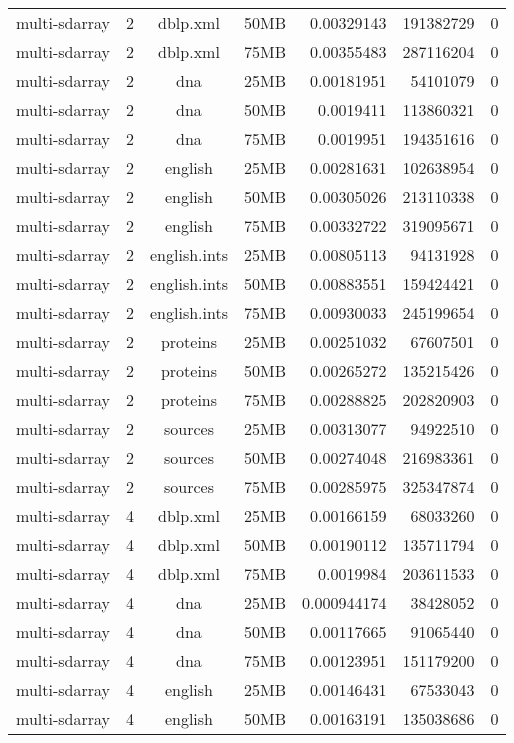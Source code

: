 \begin{table}[h]
\begin{center}
\begin{tabular}{ccccrrr}
multi-sdarray & 2 & dblp.xml & 50MB & 0.00329143 & 191382729 & 0 \\
multi-sdarray & 2 & dblp.xml & 75MB & 0.00355483 & 287116204 & 0 \\
multi-sdarray & 2 & dna & 25MB & 0.00181951 & 54101079 & 0 \\
multi-sdarray & 2 & dna & 50MB & 0.0019411 & 113860321 & 0 \\
multi-sdarray & 2 & dna & 75MB & 0.0019951 & 194351616 & 0 \\
multi-sdarray & 2 & english & 25MB & 0.00281631 & 102638954 & 0 \\
multi-sdarray & 2 & english & 50MB & 0.00305026 & 213110338 & 0 \\
multi-sdarray & 2 & english & 75MB & 0.00332722 & 319095671 & 0 \\
multi-sdarray & 2 & english.ints & 25MB & 0.00805113 & 94131928 & 0 \\
multi-sdarray & 2 & english.ints & 50MB & 0.00883551 & 159424421 & 0 \\
multi-sdarray & 2 & english.ints & 75MB & 0.00930033 & 245199654 & 0 \\
multi-sdarray & 2 & proteins & 25MB & 0.00251032 & 67607501 & 0 \\
multi-sdarray & 2 & proteins & 50MB & 0.00265272 & 135215426 & 0 \\
multi-sdarray & 2 & proteins & 75MB & 0.00288825 & 202820903 & 0 \\
multi-sdarray & 2 & sources & 25MB & 0.00313077 & 94922510 & 0 \\
multi-sdarray & 2 & sources & 50MB & 0.00274048 & 216983361 & 0 \\
multi-sdarray & 2 & sources & 75MB & 0.00285975 & 325347874 & 0 \\
multi-sdarray & 4 & dblp.xml & 25MB & 0.00166159 & 68033260 & 0 \\
multi-sdarray & 4 & dblp.xml & 50MB & 0.00190112 & 135711794 & 0 \\
multi-sdarray & 4 & dblp.xml & 75MB & 0.0019984 & 203611533 & 0 \\
multi-sdarray & 4 & dna & 25MB & 0.000944174 & 38428052 & 0 \\
multi-sdarray & 4 & dna & 50MB & 0.00117665 & 91065440 & 0 \\
multi-sdarray & 4 & dna & 75MB & 0.00123951 & 151179200 & 0 \\
multi-sdarray & 4 & english & 25MB & 0.00146431 & 67533043 & 0 \\
multi-sdarray & 4 & english & 50MB & 0.00163191 & 135038686 & 0 \\

\end{tabular}
\end{center}
\end{table}
